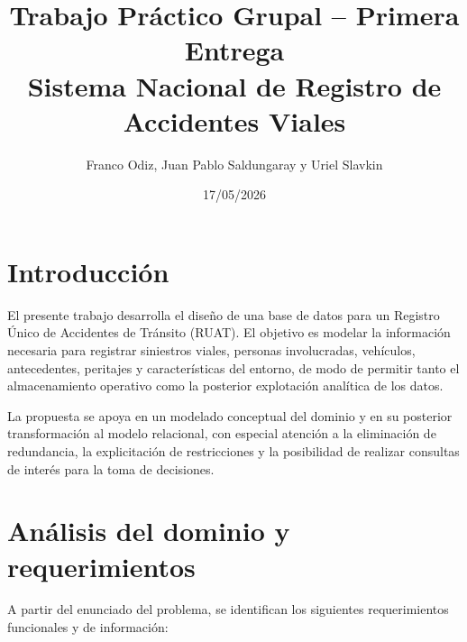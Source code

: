 \documentclass[12pt,a4paper]{article}
\title{Trabajo Práctico Grupal -- Primera Entrega\\Sistema Nacional de Registro de Accidentes Viales}
\author{Franco Odiz, Juan Pablo Saldungaray y Uriel Slavkin}
\date{17/05/2026}
\begin{document}
\maketitle

\section{Introducción}

El presente trabajo desarrolla el diseño de una base de datos para un Registro Único de Accidentes de Tránsito (RUAT). El objetivo es modelar la información necesaria para registrar siniestros viales, personas involucradas, vehículos, antecedentes, peritajes y características del entorno, de modo de permitir tanto el almacenamiento operativo como la posterior explotación analítica de los datos.

La propuesta se apoya en un modelado conceptual del dominio y en su posterior transformación al modelo relacional, con especial atención a la eliminación de redundancia, la explicitación de restricciones y la posibilidad de realizar consultas de interés para la toma de decisiones.

\section{Análisis del dominio y requerimientos}

A partir del enunciado del problema, se identifican los siguientes requerimientos funcionales y de información:
\end{document}
